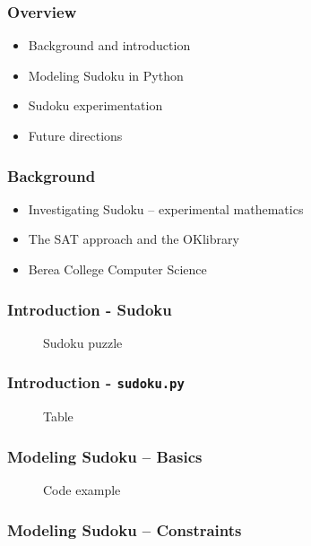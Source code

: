 \documentclass{beamer}
\title{\talktitle}
\author{\Us}
\date{\talkdate}
\begin{document}
\begin{frame}
  \titlepage
  \conferencebanner
\end{frame}

\begin{frame}
\frametitle{Overview}
 \begin{itemize}
  \item<1-> Background and introduction
  \item<2-> Modeling Sudoku in Python
  \item<3-> Sudoku experimentation
  \item<4-> Future directions
 \end{itemize}
\end{frame}

\begin{frame}
\frametitle{Background}
 \begin{itemize}
  \item<1-> Investigating Sudoku -- experimental mathematics
  \item<2-> The SAT approach and the OKlibrary
  \item<3-> Berea College Computer Science
 \end{itemize}
\end{frame}

\begin{frame}
\frametitle{Introduction - Sudoku}
 \begin{figure}[h]
  \centering
  \sudokuexampleone
  \caption{Sudoku puzzle}
 \end{figure} 
\end{frame}

\begin{frame}
\frametitle{Introduction - \texttt{sudoku.py}}
 \begin{figure}[h]
  \centering
  \librarytable
  \caption{Table}
 \end{figure} 
\end{frame}

\begin{frame}[fragile]
\frametitle{Modeling Sudoku -- Basics}
 \begin{figure}[h]
  \centering
  
  \caption{Code example}
 \end{figure} 
\end{frame}

\begin{frame}
\frametitle{Modeling Sudoku -- Constraints}

\end{frame}
\end{document}

